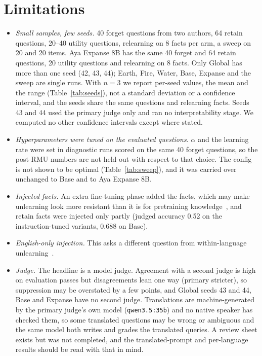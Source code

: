 \documentclass[10pt,twocolumn]{article}
\newcommand{\code}[1]{\texttt{#1}}
\begin{document}
\section{Limitations}
\label{sec:limits}
\begin{itemize}
  \item \emph{Small samples, few seeds.} 40 forget questions from two authors, 64 retain questions, 20--40 utility questions, relearning on 8 facts per arm, a sweep on 20 and 20 items. Aya Expanse 8B has the same 40 forget and 64 retain questions, 20 utility questions and relearning on 8 facts. Only Global has more than one seed (42, 43, 44); Earth, Fire, Water, Base, Expanse and the sweep are single runs. With $n=3$ we report per-seed values, the mean and the range (Table~\ref{tab:seeds}), not a standard deviation or a confidence interval, and the seeds share the same questions and relearning facts. Seeds 43 and 44 used the primary judge only and ran no interpretability stage. We computed no other confidence intervals except where stated.
  \item \emph{Hyperparameters were tuned on the evaluated questions.} $\alpha$ and the learning rate were set in diagnostic runs scored on the same 40 forget questions, so the post-RMU numbers are not held-out with respect to that choice. The config is not shown to be optimal (Table~\ref{tab:sweep}), and it was carried over unchanged to Base and to Aya Expanse 8B.
  \item \emph{Injected facts.} An extra fine-tuning phase added the facts, which may make unlearning look more resistant than it is for pretraining knowledge~\cite{deeb2024unlearning}, and retain facts were injected only partly (judged accuracy 0.52 on the instruction-tuned variants, 0.688 on Base).
  \item \emph{English-only injection.} This asks a different question from within-language unlearning~\cite{farashah2026amnesia}.
  \item \emph{Judge.} The headline is a model judge. Agreement with a second judge is high on evaluation passes but disagreements lean one way (primary stricter), so suppression may be overstated by a few points, and Global seeds 43 and 44, Base and Expanse have no second judge. Translations are machine-generated by the primary judge's own model (\code{qwen3.5:35b}) and no native speaker has checked them, so some translated questions may be wrong or ambiguous and the same model both writes and grades the translated queries. A review sheet exists but was not completed, and the translated-prompt and per-language results should be read with that in mind.

\end{itemize}
\end{document}
